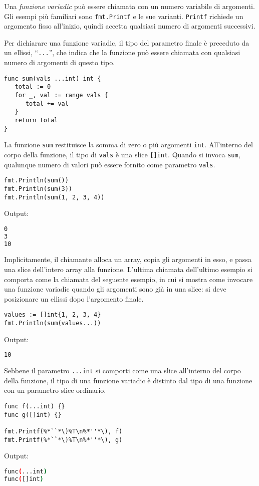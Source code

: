 Una \textit{funzione variadic} può essere chiamata con un numero variabile di argomenti.
Gli esempi più familiari sono \verb|fmt.Printf| e le sue varianti.
\verb|Printf| richiede un argomento fisso all'inizio, quindi accetta qualsiasi numero di argomenti successivi.

Per dichiarare una funzione variadic, il tipo del parametro finale è preceduto da un ellissi, ``\verb|...|'', che indica che la funzione può essere chiamata con qualsiasi numero di argomenti di questo tipo.
\begin{lstlisting}[frame=single, label={lst:lstlisting4-7.1}]
func sum(vals ...int) int {
   total := 0
   for _, val := range vals {
      total += val
   }
   return total
}
\end{lstlisting}
La funzione \verb|sum| restituisce la somma di zero o più argomenti \verb|int|.
All'interno del corpo della funzione, il tipo di \verb|vals| è una slice \verb|[]int|.
Quando si invoca \verb|sum|, qualunque numero di valori può essere fornito come parametro \verb|vals|.
\begin{lstlisting}[frame=single, label={lst:lstlisting4-7.2}]
fmt.Println(sum())
fmt.Println(sum(3))
fmt.Println(sum(1, 2, 3, 4))
\end{lstlisting}
Output:
\begin{lstlisting}[language=bash, frame=L, label={lst:lstlisting4-7.3}]
0
3
10
\end{lstlisting}
Implicitamente, il chiamante alloca un array, copia gli argomenti in esso, e passa una slice dell'intero array alla funzione.
L'ultima chiamata dell'ultimo esempio si comporta come la chiamata del seguente esempio, in cui si mostra come invocare una funzione variadic quando gli argomenti sono già in una slice: si deve posizionare un ellissi dopo l'argomento finale.
\begin{lstlisting}[frame=single, label={lst:lstlisting4-7.4}]
values := []int{1, 2, 3, 4}
fmt.Println(sum(values...))
\end{lstlisting}
Output:
\begin{lstlisting}[language=bash, frame=L, label={lst:lstlisting4-7.5}]
10
\end{lstlisting}
Sebbene il parametro \verb|...int| si comporti come una slice all'interno del corpo della funzione, il tipo di una funzione variadic è distinto dal tipo di una funzione con un parametro slice ordinario.
\begin{lstlisting}[frame=single, label={lst:lstlisting4-7.6}]
func f(...int) {}
func g([]int) {}

fmt.Printf(%*``*\)%T\n%*''*\), f)
fmt.Printf(%*``*\)%T\n%*''*\), g)
\end{lstlisting}
Output:
\begin{lstlisting}[language=bash, frame=L, label={lst:lstlisting4-7.7}]
func(...int)
func([]int)
\end{lstlisting}